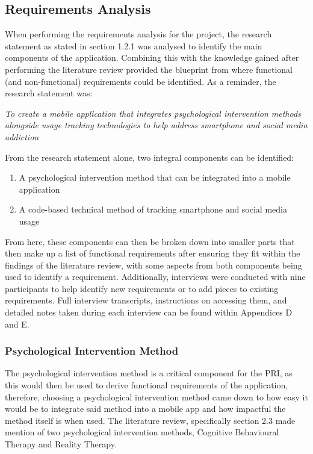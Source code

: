 \documentclass[12pt]{article}
\begin{document}
\newpage

\subsection{Requirements Analysis}
When performing the requirements analysis for the project, the research statement as stated in section 1.2.1 was analysed to identify the main components of the application. Combining this with
the knowledge gained after performing the literature review provided the blueprint from where functional (and non-functional) requirements could be identified. As a reminder, the research
statement was:\newline

\textit{To create a mobile application that integrates psychological intervention methods alongside usage tracking technologies to help address smartphone and social media addiction}\newline

From the research statement alone, two integral components can be identified:

\begin{enumerate}
	\item A psychological intervention method that can be integrated into a mobile application
	\item A code-based technical method of tracking smartphone and social media usage
\end{enumerate}

From here, these components can then be broken down into smaller parts that then make up a list of functional requirements after ensuring they fit within the findings of the literature
review, with some aspects from both components being used to identify a requirement. Additionally, interviews were conducted with nine participants to help identify new requirements or 
to add pieces to existing requirements. Full interview transcripts, instructions on accessing them, and detailed notes taken during each interview
can be found within Appendices D and E. \newline

\subsubsection{Psychological Intervention Method}

The psychological intervention method is a critical component for the PRI, as this would then be used to derive functional requirements of the application, therefore,
choosing a psychological intervention method came down to how easy it would be to integrate said method into a mobile app and how impactful the method itself is when used. The literature review,
specifically section 2.3 made mention of two psychological intervention methods, Cognitive Behavioural Therapy and Reality Therapy. \newline
\end{document}
